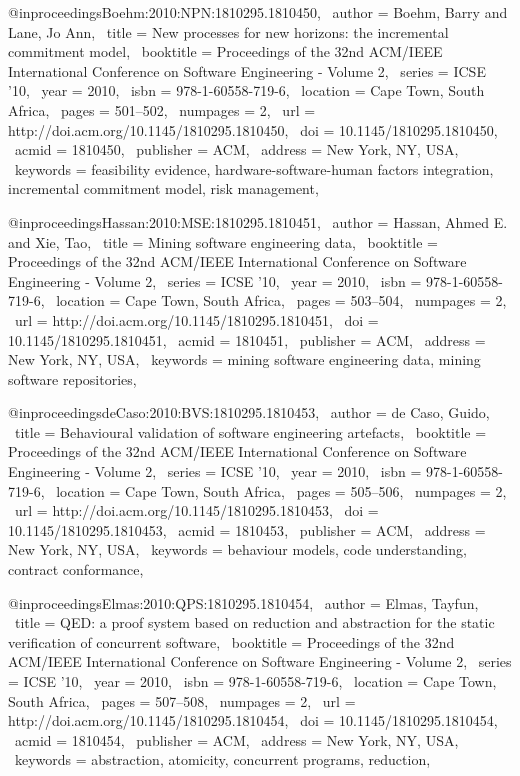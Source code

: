 @inproceedings{Boehm:2010:NPN:1810295.1810450,
 author = {Boehm, Barry and Lane, Jo Ann},
 title = {New processes for new horizons: the incremental commitment model},
 booktitle = {Proceedings of the 32nd ACM/IEEE International Conference on Software Engineering - Volume 2},
 series = {ICSE '10},
 year = {2010},
 isbn = {978-1-60558-719-6},
 location = {Cape Town, South Africa},
 pages = {501--502},
 numpages = {2},
 url = {http://doi.acm.org/10.1145/1810295.1810450},
 doi = {10.1145/1810295.1810450},
 acmid = {1810450},
 publisher = {ACM},
 address = {New York, NY, USA},
 keywords = {feasibility evidence, hardware-software-human factors integration, incremental commitment model, risk management},
} 

@inproceedings{Hassan:2010:MSE:1810295.1810451,
 author = {Hassan, Ahmed E. and Xie, Tao},
 title = {Mining software engineering data},
 booktitle = {Proceedings of the 32nd ACM/IEEE International Conference on Software Engineering - Volume 2},
 series = {ICSE '10},
 year = {2010},
 isbn = {978-1-60558-719-6},
 location = {Cape Town, South Africa},
 pages = {503--504},
 numpages = {2},
 url = {http://doi.acm.org/10.1145/1810295.1810451},
 doi = {10.1145/1810295.1810451},
 acmid = {1810451},
 publisher = {ACM},
 address = {New York, NY, USA},
 keywords = {mining software engineering data, mining software repositories},
} 

@inproceedings{deCaso:2010:BVS:1810295.1810453,
 author = {de Caso, Guido},
 title = {Behavioural validation of software engineering artefacts},
 booktitle = {Proceedings of the 32nd ACM/IEEE International Conference on Software Engineering - Volume 2},
 series = {ICSE '10},
 year = {2010},
 isbn = {978-1-60558-719-6},
 location = {Cape Town, South Africa},
 pages = {505--506},
 numpages = {2},
 url = {http://doi.acm.org/10.1145/1810295.1810453},
 doi = {10.1145/1810295.1810453},
 acmid = {1810453},
 publisher = {ACM},
 address = {New York, NY, USA},
 keywords = {behaviour models, code understanding, contract conformance},
} 

@inproceedings{Elmas:2010:QPS:1810295.1810454,
 author = {Elmas, Tayfun},
 title = {QED: a proof system based on reduction and abstraction for the static verification of concurrent software},
 booktitle = {Proceedings of the 32nd ACM/IEEE International Conference on Software Engineering - Volume 2},
 series = {ICSE '10},
 year = {2010},
 isbn = {978-1-60558-719-6},
 location = {Cape Town, South Africa},
 pages = {507--508},
 numpages = {2},
 url = {http://doi.acm.org/10.1145/1810295.1810454},
 doi = {10.1145/1810295.1810454},
 acmid = {1810454},
 publisher = {ACM},
 address = {New York, NY, USA},
 keywords = {abstraction, atomicity, concurrent programs, reduction},
} 

